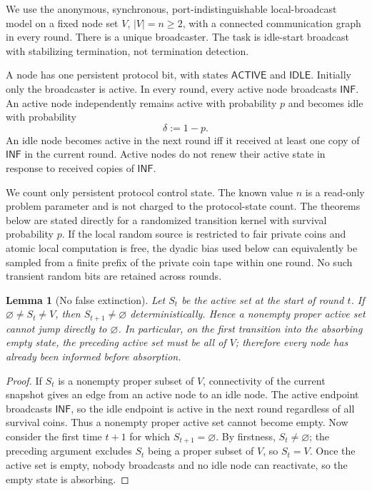 \documentclass[11pt]{article}
\newtheorem{lemma}[theorem]{Lemma}
\newcommand{\A}{\mathsf{ACTIVE}}
\newcommand{\I}{\mathsf{IDLE}}
\begin{document}
We use the anonymous, synchronous, port-indistinguishable local-broadcast model
on a fixed node set $V$, $|V|=n\ge2$, with a connected communication graph in
every round.  There is a unique broadcaster.  The task is idle-start broadcast
with stabilizing termination, not termination detection.

A node has one persistent protocol bit, with states $\A$ and $\I$.
Initially only the broadcaster is active.  In every round, every active node
broadcasts $\mathsf{INF}$.  An active node independently remains active with
probability $p$ and becomes idle with probability
\[
  \delta:=1-p.
\]
An idle node becomes active in the next round iff it received at least one
copy of $\mathsf{INF}$ in the current round.  Active nodes do not renew their
active state in response to received copies of $\mathsf{INF}$.

We count only persistent protocol control state.  The known value $n$ is a
read-only problem parameter and is not charged to the protocol-state count.
The theorems below are stated directly for a randomized transition kernel with
survival probability $p$.  If the local random source is restricted to fair
private coins and atomic local computation is free, the dyadic bias used below
can equivalently be sampled from a finite prefix of the private coin tape
within one round.  No such transient random bits are retained across rounds.

\begin{lemma}[No false extinction]
Let $S_t$ be the active set at the start of round $t$.  If
$\varnothing\neq S_t\neq V$, then $S_{t+1}\neq\varnothing$
deterministically.  Hence a nonempty proper active set cannot jump directly to
$\varnothing$.  In particular, on the first transition into the absorbing
empty state, the preceding active set must be all of $V$; therefore every node
has already been informed before absorption.
\end{lemma}

\begin{proof}
If $S_t$ is a nonempty proper subset of $V$, connectivity of the current
snapshot gives an edge from an active node to an idle node.  The active
endpoint broadcasts $\mathsf{INF}$, so the idle endpoint is active in the next
round regardless of all survival coins.  Thus a nonempty proper active set
cannot become empty.  Now consider the first time $t+1$ for which
$S_{t+1}=\varnothing$.  By firstness, $S_t\neq\varnothing$; the preceding
argument excludes $S_t$ being a proper subset of $V$, so $S_t=V$.  Once the
active set is empty, nobody broadcasts and no idle node can reactivate, so the
empty state is absorbing.
\end{proof}
\end{document}

